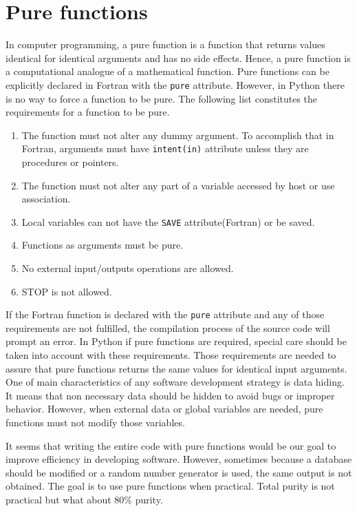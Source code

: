 \section{Pure functions} 
In computer programming, a pure function is a function 
that returns values identical for identical arguments
and has no side effects. 
Hence, a pure function is a computational analogue of a mathematical function. 
Pure functions can be explicitly declared in Fortran with the \verb|pure| attribute.
However, in Python there is no way to force a function to be pure.  
The following list constitutes the requirements for a function to be pure.    
 \begin{enumerate}
  \setlength\itemsep{0.1cm}
 \item The function must not alter any dummy argument. 
 To accomplish that in Fortran,  arguments must have \verb|intent(in)| attribute 
 unless they are procedures or pointers.   
 \item The function must  not alter any part of a variable accessed by host or 
 use association. 
 \item Local variables can not have the \verb|SAVE| attribute(Fortran) or be saved. 
 \item Functions as arguments must be pure. 
 \item No external input/outputs operations are allowed. 
 \item STOP is not allowed. 
 \end{enumerate}   
If the Fortran function is declared with the \verb|pure| attribute and any of those 
requirements are not fulfilled, the compilation process of the source code will prompt an error.
In Python if pure functions are required, special care should be taken into account with these 
requirements. 
Those requirements are needed to assure that pure functions returns 
the same values for identical input arguments. 
One of main characteristics of any software development strategy is data hiding. It means that
non necessary data should be hidden to avoid bugs or improper behavior. 
However, when external data or global variables are needed, 
pure functions must not modify those variables. 

It seems that writing the entire code with pure functions would be our goal to improve 
efficiency in developing software. However, sometimes because a database should be modified 
or a random number generator is used, the same output is not obtained. 
The goal is to use pure functions when practical. Total purity 
is not practical but what about  80\% purity.


